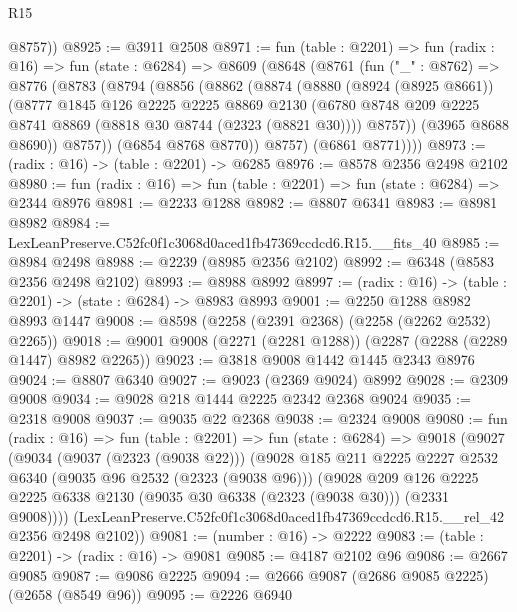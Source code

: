 \begin{lexlean}{R15}
\begin{coremodule}
        @8757))
@8925 := @3911 @2508
@8971 := fun (table : @2201) =>
  fun (radix : @16) =>
  fun (state : @6284) =>
  @8609
    (@8648
      (@8761
        (fun ("_" : @8762) =>
        @8776
          (@8783
            (@8794
              (@8856
                (@8862
                  (@8874
                    (@8880
                      (@8924 (@8925 @8661))
                      (@8777
                        @1845
                        @126
                        @2225
                        @2225
                        @8869
                        @2130
                        (@6780 @8748 @209 @2225 @8741 @8869 (@8818 @30 @8744 (@2323 (@8821 @30))))
                        @8757))
                    (@3965 @8688 @8690))
                  @8757))
              (@6854 @8768 @8770))
            @8757)
          (@6861 @8771))))
@8973 := (radix : @16) -> (table : @2201) -> @6285
@8976 := @8578 @2356 @2498 @2102
@8980 := fun (radix : @16) => fun (table : @2201) => fun (state : @6284) => @2344 @8976
@8981 := @2233 @1288
@8982 := @8807 @6341
@8983 := @8981 @8982
@8984 := LexLeanPreserve.C52fc0f1c3068d0aced1fb47369ccdcd6.R15.__fits_40
@8985 := @8984 @2498
@8988 := @2239 (@8985 @2356 @2102)
@8992 := @6348 (@8583 @2356 @2498 @2102)
@8993 := @8988 @8992
@8997 := (radix : @16) -> (table : @2201) -> (state : @6284) -> @8983 @8993
@9001 := @2250 @1288 @8982 @8993 @1447
@9008 := @8598 (@2258 (@2391 @2368) (@2258 (@2262 @2532) @2265))
@9018 := @9001 @9008 (@2271 (@2281 @1288)) (@2287 (@2288 (@2289 @1447) @8982 @2265))
@9023 := @3818 @9008 @1442 @1445 @2343 @8976
@9024 := @8807 @6340
@9027 := @9023 (@2369 @9024) @8992
@9028 := @2309 @9008
@9034 := @9028 @218 @1444 @2225 @2342 @2368 @9024
@9035 := @2318 @9008
@9037 := @9035 @22 @2368
@9038 := @2324 @9008
@9080 := fun (radix : @16) =>
  fun (table : @2201) =>
  fun (state : @6284) =>
  @9018
    (@9027
      (@9034
        (@9037 (@2323 (@9038 @22)))
        (@9028
          @185
          @211
          @2225
          @2227
          @2532
          @6340
          (@9035 @96 @2532 (@2323 (@9038 @96)))
          (@9028
            @209
            @126
            @2225
            @2225
            @6338
            @2130
            (@9035 @30 @6338 (@2323 (@9038 @30)))
            (@2331 @9008))))
      (LexLeanPreserve.C52fc0f1c3068d0aced1fb47369ccdcd6.R15.__rel_42 @2356 @2498 @2102))
@9081 := (number : @16) -> @2222
@9083 := (table : @2201) -> (radix : @16) -> @9081
@9085 := @4187 @2102 @96
@9086 := @2667 @9085
@9087 := @9086 @2225
@9094 := @2666 @9087 (@2686 @9085 @2225) (@2658 (@8549 @96))
@9095 := @2226 @6940

\end{coremodule}
\end{lexlean}
